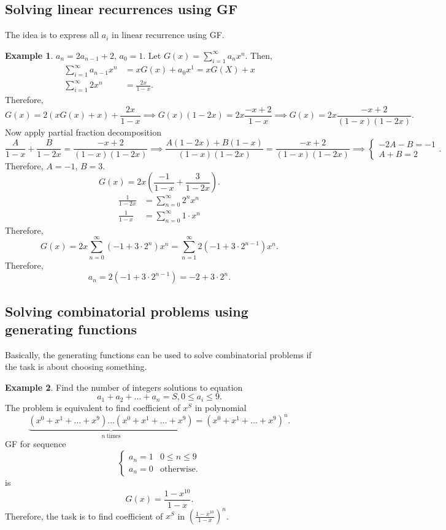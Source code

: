 \documentclass[a4paper]{article}
\theoremstyle{definition}
\newtheorem{example}{Example}[section]
\begin{document}
\subsection{Solving linear recurrences using GF}

The idea is to express all \(a_i\) in linear recurrence using GF.
\begin{example}
  \(a_n = 2 a_{n - 1} + 2\),  \(a_0 = 1\).
  Let  \(G(x) = \sum_{i = 1}^\infty a_n x^n\).
  Then,
  \begin{align*}
    \sum_{i = 1}^\infty a_{n - 1} x^n &= x G(x) + a_0 x^1 = x G(X) + x \\
    \sum_{i = 1}^\infty 2 x^n &= \frac{2x}{1 - x}.
  \end{align*}
  Therefore,
  \[
    G(x) = 2 (x G(x) + x) + \frac{2x}{1 - x}
    \implies
    G(x)(1 - 2x) = 2x\frac{-x + 2}{1 - x}
    \implies
    G(x) = 2x \frac{-x + 2}{(1-x)(1-2x)}
  .\]
  Now apply partial fraction decomposition
  \[
  \frac{A}{1 - x} + \frac{B}{1 - 2x} = \frac{-x + 2}{(1-x)(1-2x)}
  \implies
  \frac{A(1 - 2x) + B(1-x)}{(1-x)(1-2x)} = \frac{-x + 2}{(1-x)(1-2x)}
  \implies
  \begin{cases}
    -2A - B = -1 \\
    A + B = 2
  \end{cases}
  .\]
  Therefore, \(A = -1\), \(B = 3\).
  \[
    G(x) = 2x \left( \frac{-1}{1 - x} + \frac{3}{1 - 2x} \right)
  .\]
  \begin{align*}
    \frac{1}{1 - 2x} &= \sum_{n = 0}^\infty 2^n x^n \\
    \frac{1}{1 - x} &= \sum_{n = 0}^\infty 1 \cdot x^n
  \end{align*}
  Therefore,
  \[
    G(x) = 2x \sum_{n = 0}^\infty (-1 + 3 \cdot 2^n) x^n
    = \sum_{n = 1}^\infty 2 (-1 + 3 \cdot 2^{n - 1}) x^n
  .\]
  Therefore,
  \[
    a_n = 2(-1 + 3 \cdot 2^{n - 1}) = -2 + 3 \cdot 2^n
  .\]
\end{example}

\subsection{Solving combinatorial problems using generating functions}

Basically, the generating functions can be used to solve combinatorial
problems if the task is about choosing something.

\begin{example}
  Find the number of integers solutions to equation
  \[
    a_1 + a_2 + \ldots + a_n = S, 0 \le a_i \le 9
  .\]
  The problem is equivalent to find coefficient of \(x^S\)
  in polynomial
   \[
     \underbrace{(x^0 + x^1 + \ldots + x^9) \ldots (x^0 + x^1 + \ldots +
     x^9)}_{n\ \text{times}} = (x^0  + x^1 + \ldots + x^9)^n
  .\]
  GF for sequence
  \[
    \begin{cases}
      a_n = 1 & 0 \le n \le 9 \\
      a_n = 0 & \text{otherwise}.
    \end{cases}
  \]
  is
  \[
    G(x) = \frac{1 - x^{10}}{1 - x}
  .\]
  Therefore, the task is to find coefficient of \(x^S\)
  in \(\left( \frac{1 - x^{10}}{1 - x} \right)^n \).
\end{example}
\end{document}
